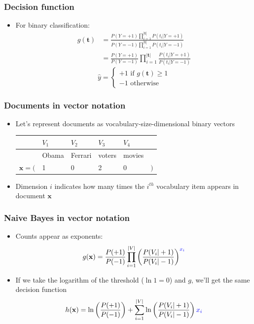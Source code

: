 \documentclass[14pt,mathserif,dvipsnames,usenames]{beamer}
\newcommand{\x}{\mathbf{x}}
\begin{document}
\begin{frame}\frametitle{Decision function}
\begin{itemize}
  \item For binary classification:
    \begin{align}\nonumber
    g(\mathbf{t}) & = \frac{P(Y=+1)\prod_{i=1}^{|\mathbf{t}|} P(t_i|Y=+1)}
                {P(Y=-1)\prod_{i=1}^{|\mathbf{t}|} P(t_i|Y=-1)}\\\nonumber
         & = \frac{P(Y=+1)}{P(Y=-1)}\prod_{i=1}^{|\mathbf{t}|} \frac{P(t_i|Y=+1)}{P(t_i|Y=-1)}
    \end{align}
    \[
    \hat{y} = 
    \begin{cases}
      +1 \text{ if } g(\mathbf{t}) \geq 1\\
      -1 \text{ otherwise }
    \end{cases}
    \]
  \end{itemize}
\end{frame}

\begin{frame}
  \frametitle{Documents in vector notation}
  \begin{itemize}
  \item Let's represent documents as vocabulary-size-dimensional
    binary vectors 

    \begin{tabular}{rlllll}
          &    $V_1$& $V_2$   & $V_3$   & $V_4$   & \\\hline
          & Obama   & Ferrari & voters  & movies & \\\hline
$\x = ($   & 1       & 0       & 2       & 0 & $)$\\
    \end{tabular}
  \item Dimension $i$ indicates how many times the $i^{th}$ vocabulary
    item appears in document $\x$
  \end{itemize}
\end{frame}

\begin{frame}
  \frametitle{Naive Bayes in vector notation}
  \begin{itemize}
  \item 
    Counts appear as exponents:
    \[
      g(\x) = \frac{P(+1)}{P(-1)} \prod_{i=1}^{|V|} \left(\frac{P(V_i|+1)}{P(V_i|-1)}\right)^{\color{blue} x_i}
    \]
  \item If we take the logarithm of the threshold ($\ln 1 = 0$) and
    $g$, we'll get the same decision function
    \begin{align*}
      h(\x) = \ln\left(\frac{P(+1)}{P(-1)}\right) + \sum_{i=1}^{|V|} \ln\left(\frac{P(V_i|+1)}{P(V_i|-1)}\right)\color{blue}x_i
    \end{align*}
  \end{itemize}
\end{frame}
\end{document}
